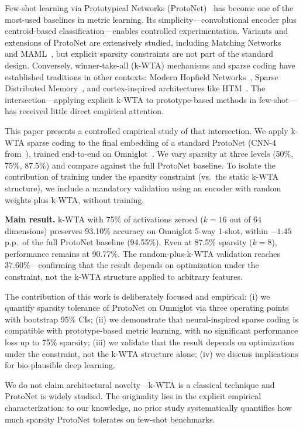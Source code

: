 \documentclass[11pt]{article}
\begin{document}
Few-shot learning via Prototypical Networks (ProtoNet)~\citep{snell2017prototypical} has become one of the most-used baselines in metric learning. Its simplicity---convolutional encoder plus centroid-based classification---enables controlled experimentation. Variants and extensions of ProtoNet are extensively studied, including Matching Networks~\citep{vinyals2016matching} and MAML~\citep{finn2017model}, but explicit sparsity constraints are not part of the standard design. Conversely, winner-take-all (k-WTA) mechanisms and sparse coding have established traditions in other contexts: Modern Hopfield Networks~\citep{ramsauer2021hopfield}, Sparse Distributed Memory~\citep{kanerva1988sparse}, and cortex-inspired architectures like HTM~\citep{ahmad2019dense}. The intersection---applying explicit k-WTA to prototype-based methods in few-shot---has received little direct empirical attention.

This paper presents a controlled empirical study of that intersection. We apply k-WTA sparse coding to the final embedding of a standard ProtoNet (CNN-4 from~\citet{snell2017prototypical}), trained end-to-end on Omniglot~\citep{lake2015human}. We vary sparsity at three levels (50\%, 75\%, 87.5\%) and compare against the full ProtoNet baseline. To isolate the contribution of training under the sparsity constraint (vs.\ the static k-WTA structure), we include a mandatory validation using an encoder with random weights plus k-WTA, without training.

\textbf{Main result.} k-WTA with 75\% of activations zeroed ($k=16$ out of 64 dimensions) preserves 93.10\% accuracy on Omniglot 5-way 1-shot, within $-1.45$ p.p.\ of the full ProtoNet baseline (94.55\%). Even at 87.5\% sparsity ($k=8$), performance remains at 90.77\%. The random-plus-k-WTA validation reaches 37.60\%---confirming that the result depends on optimization under the constraint, not the k-WTA structure applied to arbitrary features.

The contribution of this work is deliberately focused and empirical: (i) we quantify sparsity tolerance of ProtoNet on Omniglot via three operating points with bootstrap 95\% CIs; (ii) we demonstrate that neural-inspired sparse coding is compatible with prototype-based metric learning, with no significant performance loss up to 75\% sparsity; (iii) we validate that the result depends on optimization under the constraint, not the k-WTA structure alone; (iv) we discuss implications for bio-plausible deep learning.

We do not claim architectural novelty---k-WTA is a classical technique and ProtoNet is widely studied. The originality lies in the explicit empirical characterization: to our knowledge, no prior study systematically quantifies how much sparsity ProtoNet tolerates on few-shot benchmarks.
\end{document}
